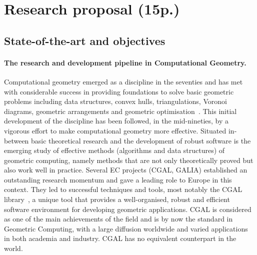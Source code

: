 \section{Research proposal (15p.)}

\subsection{State-of-the-art and objectives}

\paragraph{The research and development pipeline in Computational Geometry.}

Computational geometry emerged as a discipline in the seventies and has met with considerable success in providing foundations to solve basic geometric problems including data structures, convex hulls, triangulations, Voronoi diagrams, geometric arrangements and geometric optimisation~\cite{by-ag-98}. This initial development of the discipline has been followed, in the mid-nineties, by a vigorous effort to make computational geometry more effective.  Situated in-between basic theoretical research and the development of robust software is the emerging study of effective methods (algorithms and data structures) of geometric computing, namely methods that are not only theoretically proved but also work well in practice.  Several EC projects (CGAL, GALIA) established an outstanding research momentum and gave a leading role to Europe in this context.  They led to successful techniques and tools, most notably the CGAL library~\cite{cgal}, a unique tool that provides a well-organised, robust and efficient software environment for developing geometric applications. CGAL is considered as one of the main achievements of the field and is by now the standard in Geometric Computing, with a large diffusion worldwide and varied applications in both academia and industry. CGAL has no equivalent counterpart in the world.

